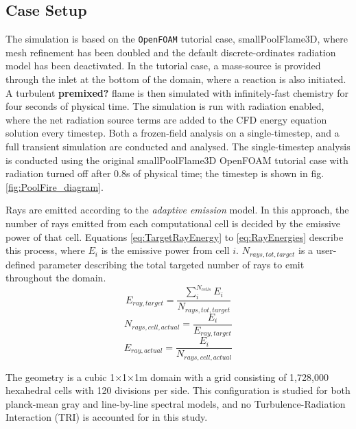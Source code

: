 \subsection{Case Setup}
The simulation is based on the \verb|OpenFOAM| tutorial case, smallPoolFlame3D, where mesh refinement has been doubled and the default discrete-ordinates radiation model has been deactivated. 
In the tutorial case, a mass-source is provided through the inlet at the bottom of the domain, where a reaction is also initiated. A turbulent \textbf{premixed?} flame is then simulated with infinitely-fast chemistry for four seconds of physical time.
The simulation is run with radiation enabled, where the net radiation source terms are added to the CFD energy equation solution every timestep.
Both a frozen-field analysis on a single-timestep, and a full transient simulation are conducted and analysed. The single-timestep analysis is conducted using the original smallPoolFlame3D OpenFOAM tutorial case with radiation turned off after 0.8s of physical time; the timestep is shown in fig. \ref{fig:PoolFire_diagram}.

Rays are emitted according to the \textit{adaptive emission} model. In this approach, the number of rays emitted from each computational cell is decided by the emissive power of that cell. Equations \ref{eq:TargetRayEnergy} to \ref{eq:RayEnergies} describe this process, where $E_i$ is the emissive power from cell $i$. 
$N_{rays,tot,target}$ is a user-defined parameter describing the total targeted number of rays to emit throughout the domain.
\begin{equation}
    E_{ray,target}=\frac{\sum^{N_{cells}}_{i}E_{i}}{N_{rays,tot,target}}
    \label{eq:TargetRayEnergy}
\end{equation}
\begin{equation}
    N_{rays,cell,actual}=\frac{E_{i}}{E_{ray,target}}
    \label{eq:NumberOfRays}
\end{equation}
\begin{equation}
    E_{ray,actual}=\frac{E_{i}}{N_{rays,cell,actual}}
    \label{eq:RayEnergies}
\end{equation}


The geometry is a cubic 1$\times$1$\times$1m domain with a grid consisting of 1,728,000 hexahedral cells with 120 divisions per side.
This configuration is studied for both planck-mean gray and line-by-line spectral models, and no Turbulence-Radiation Interaction (TRI) is accounted for in this study.

